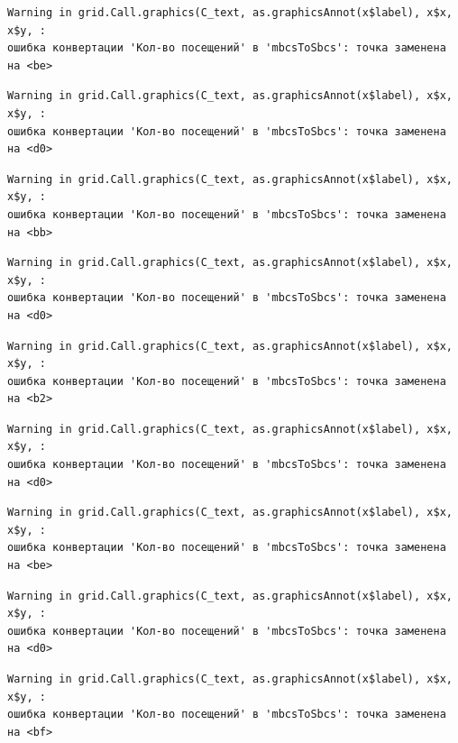 \documentclass[
  letterpaper,
  DIV=11,
  numbers=noendperiod]{scrreprt}
\begin{document}
\begin{verbatim}
Warning in grid.Call.graphics(C_text, as.graphicsAnnot(x$label), x$x, x$y, :
ошибка конвертации 'Кол-во посещений' в 'mbcsToSbcs': точка заменена на <be>
\end{verbatim}

\begin{verbatim}
Warning in grid.Call.graphics(C_text, as.graphicsAnnot(x$label), x$x, x$y, :
ошибка конвертации 'Кол-во посещений' в 'mbcsToSbcs': точка заменена на <d0>
\end{verbatim}

\begin{verbatim}
Warning in grid.Call.graphics(C_text, as.graphicsAnnot(x$label), x$x, x$y, :
ошибка конвертации 'Кол-во посещений' в 'mbcsToSbcs': точка заменена на <bb>
\end{verbatim}

\begin{verbatim}
Warning in grid.Call.graphics(C_text, as.graphicsAnnot(x$label), x$x, x$y, :
ошибка конвертации 'Кол-во посещений' в 'mbcsToSbcs': точка заменена на <d0>
\end{verbatim}

\begin{verbatim}
Warning in grid.Call.graphics(C_text, as.graphicsAnnot(x$label), x$x, x$y, :
ошибка конвертации 'Кол-во посещений' в 'mbcsToSbcs': точка заменена на <b2>
\end{verbatim}

\begin{verbatim}
Warning in grid.Call.graphics(C_text, as.graphicsAnnot(x$label), x$x, x$y, :
ошибка конвертации 'Кол-во посещений' в 'mbcsToSbcs': точка заменена на <d0>
\end{verbatim}

\begin{verbatim}
Warning in grid.Call.graphics(C_text, as.graphicsAnnot(x$label), x$x, x$y, :
ошибка конвертации 'Кол-во посещений' в 'mbcsToSbcs': точка заменена на <be>
\end{verbatim}

\begin{verbatim}
Warning in grid.Call.graphics(C_text, as.graphicsAnnot(x$label), x$x, x$y, :
ошибка конвертации 'Кол-во посещений' в 'mbcsToSbcs': точка заменена на <d0>
\end{verbatim}

\begin{verbatim}
Warning in grid.Call.graphics(C_text, as.graphicsAnnot(x$label), x$x, x$y, :
ошибка конвертации 'Кол-во посещений' в 'mbcsToSbcs': точка заменена на <bf>
\end{verbatim}
\end{document}
